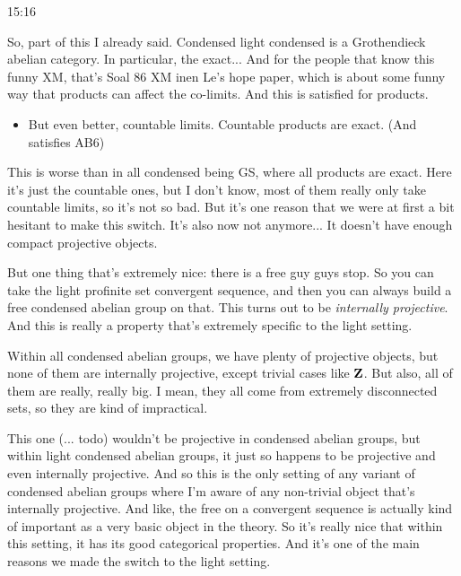 \begin{unfinished}{15:16}
\begin{example}
\begin{remark}
\begin{remark}
\begin{example}
\end{example}

So, part of this I already said. Condensed light condensed is a Grothendieck abelian category. In particular, the  exact...   And for the people that know this funny XM, that's Soal 86 XM inen Le's hope paper, which is about some funny way that products can affect the co-limits. And this is satisfied for products.

\begin{itemize}
\item But even better, countable limits. Countable products are exact. (And satisfies AB6)

\end{itemize}

This is worse than in all condensed being GS, where all products are exact. Here it's just the countable ones, but I don't know, most of them really only take countable limits, so it's not so bad. But it's one reason that we were at first a bit hesitant to make this switch. It's also now not anymore... It doesn't have enough compact projective objects.

But one thing that's extremely nice: there is a free guy guys stop. So you can take the light profinite set convergent sequence, and then you can always build a free condensed abelian group on that. This turns out to be \emph{internally projective}. And this is really a property that's extremely specific to the light setting.

Within all condensed abelian groups, we have plenty of projective objects, but none of them are internally projective, except trivial cases like $\mathbf Z$. But also, all of them are really, really big. I mean, they all come from extremely disconnected sets, so they are kind of impractical.

This one (\Z ... todo) wouldn't be projective in condensed abelian groups, but within light condensed abelian groups, it just so happens to be projective and even internally projective. And so this is the only setting of any variant of condensed abelian groups where I'm aware of any non-trivial object that's internally projective. And like, the free  on a convergent sequence is actually kind of important as a very basic object in the theory. So it's really nice that within this setting, it has its good categorical properties. And it's one of the main reasons we made the switch to the light setting.


\end{remark}
\end{remark}
\end{example}
\end{unfinished}
